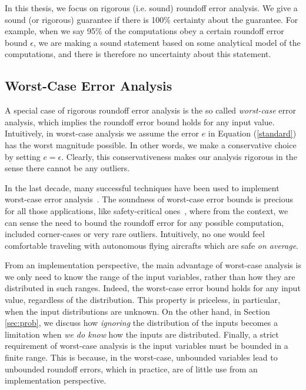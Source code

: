 In this thesis, we focus on rigorous (i.e. sound) roundoff error analysis.
%
We give a sound (or rigorous) guarantee if there is 100\% certainty about the guarantee.
%
%
For example, when we say 95\% of the computations obey a certain roundoff error bound $\epsilon$, we are making a sound statement based on some analytical model of the computations, and there is therefore no uncertainty about this statement.
%
%
\subsection{Worst-Case Error Analysis}
\label{sec:worst}
%
A special case of rigorous roundoff error analysis is the so called \emph{worst-case} error analysis, which implies the roundoff error bound holds for any input value.
%
Intuitively, in worst-case analysis we assume the error $e$ in Equation (\ref{standard}) has the worst magnitude possible. In other words, we make a conservative choice by setting $e=\epsilon$.
%
Clearly, this conservativeness makes our analysis rigorous in the sense there cannot be any outliers.
%

In the last decade, many successful techniques have been used to implement worst-case error analysis~\cite{darulova2018daisy,2015_fm_sjrg,solovyev2018rigorous,rosa,fptuner,smartfloat,satire,gappa,fluctuat}.
%
%
The soundness of worst-case error bounds is precious for all those applications, like safety-critical ones~\cite{guardstable, cpralg}, where from the context, we can sense the need to bound the roundoff error for any possible computation, included corner-cases or very rare outliers.
%
Intuitively, no one would feel comfortable traveling with autonomous flying aircrafts which are safe \emph{on average}.

%
From an implementation perspective, the main advantage of worst-case analysis is we only need to know the range of the input variables, rather than how they are distributed in such ranges. 
%
Indeed, the worst-case error bound holds for any input value, regardless of the distribution.
%
%
This property is priceless, in particular, when the input distributions are unknown.
%
On the other hand, in Section \ref{sec:prob}, we discuss how \emph{ignoring} the distribution of the inputs becomes a limitation when \emph{we do know} how the inputs are distributed.
%
Finally, a strict requirement of worst-case analysis is the input variables must be bounded  in a finite range. This is because, in the worst-case, unbounded variables lead to unbounded roundoff errors, which in practice, are of little use from an implementation perspective.
%
